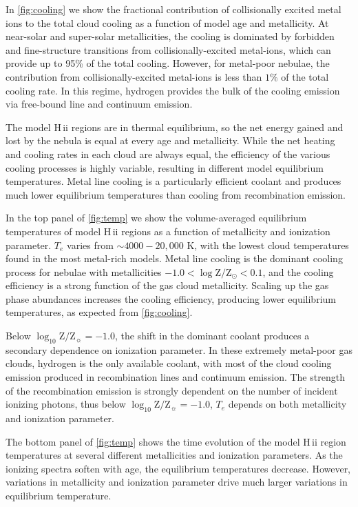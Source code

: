 \documentclass[linenumbers, trackchanges, tighten]{aastex61}%
\newcommand{\Fig}[1]{\autoref{fig:#1}}
\newcommand{\logten}{\ensuremath{\log_{10}}}
\newcommand{\Te}{\ensuremath{T_{e}}}
\newcommand{\hii}{H\,{\sc ii}\xspace}
\newcommand{\logZeq}[1]{\ensuremath{\logten \mathrm{Z}/\mathrm{Z}_{\sun} = #1}}
\begin{document}
In \Fig{cooling} we show the fractional contribution of collisionally excited metal ions to the total cloud cooling as a function of model age and metallicity. At near-solar and super-solar metallicities, the cooling is dominated by forbidden and fine-structure transitions from collisionally-excited metal-ions, which can provide up to 95\% of the total cooling. However, for metal-poor nebulae, the contribution from collisionally-excited metal-ions is less than $1\%$ of the total cooling rate. In this regime, hydrogen provides the bulk of the cooling emission via free-bound line and continuum emission.

The model \hii regions are in thermal equilibrium, so the net energy gained and lost by the nebula is equal at every age and metallicity. While the net heating and cooling rates in each cloud are always equal, the efficiency of the various cooling processes is highly variable, resulting in different model equilibrium temperatures. Metal line cooling is a particularly efficient coolant and produces much lower equilibrium temperatures than cooling from recombination emission.

In the top panel of \Fig{temp} we show the volume-averaged equilibrium temperatures of model \hii regions as a function of metallicity and ionization parameter. \Te{} varies from $\sim 4000-20,000$ K, with the lowest cloud temperatures found in the most metal-rich models. Metal line cooling is the dominant cooling process for nebulae with metallicities $-1.0 < \log \mathrm{Z}/\mathrm{Z}_{\odot} < 0.1$, and the cooling efficiency is a strong function of the gas cloud metallicity. Scaling up the gas phase abundances increases the cooling efficiency, producing lower equilibrium temperatures, as expected from \Fig{cooling}.

Below \logZeq{-1.0}, the shift in the dominant coolant produces a secondary dependence on ionization parameter. In these extremely metal-poor gas clouds, hydrogen is the only available coolant, with most of the cloud cooling emission produced in recombination lines and continuum emission. The strength of the recombination emission is strongly dependent on the number of incident ionizing photons, thus below \logZeq{-1.0}, \Te{} depends on both metallicity and ionization parameter.

The bottom panel of \Fig{temp} shows the time evolution of the model \hii region temperatures at several different metallicities and ionization parameters. As the ionizing spectra soften with age, the equilibrium temperatures decrease. However, variations in metallicity and ionization parameter drive much larger variations in equilibrium temperature.
\end{document}

